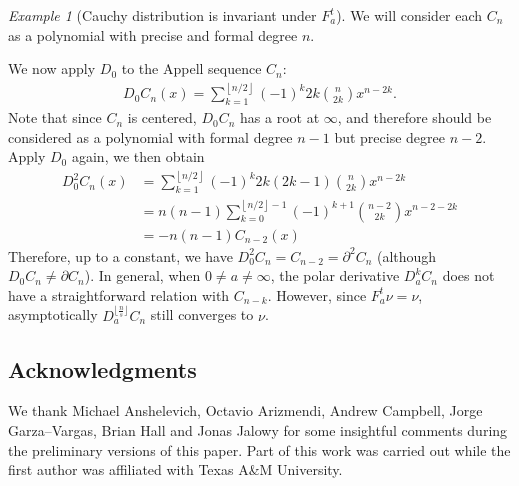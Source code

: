 \documentclass[reqno,11pt]{amsart}
\theoremstyle{remark}
\newtheorem{example}[theorem]{Example}
\newcommand{\polar}[1]{D_{#1}}
\newcommand{\pfreepower}[2]{F_{#1}^{#2}}
\begin{document}
\begin{example}[Cauchy distribution is invariant under $ \pfreepower{a}{t} $]
We will consider each $C_n$ as a polynomial with precise and formal degree $n$.

We now apply $\polar{0}$ to the Appell sequence $C_n$:
\begin{align*}\polar{0}C_n(x) = \sum_{k=1}^{\left\lfloor n/2 \right\rfloor} (-1)^k 2k\binom{n}{2k} x^{n-2k}.
\end{align*}
Note that since $C_n$ is centered, $\polar{0}C_n$ has a root at $\infty$, and therefore should be considered as a polynomial with formal degree $n-1$ but precise degree $n-2$. Apply $\polar{0}$ again, we then obtain
\begin{align*}
    \polar{0}^2C_n(x)&= \sum_{k=1}^{\left\lfloor n/2 \right\rfloor} (-1)^k 2k(2k-1)\binom{n}{2k} x^{n-2k}\\  &= n(n-1)\sum_{k=0}^{\left\lfloor n/2 \right\rfloor-1} (-1)^{k+1} \binom{n-2}{2k} x^{n-2-2k}\\&= -n(n-1)C_{n-2}(x)
\end{align*}
Therefore, up to a constant, we have $ \polar{0}^2C_n = C_{n-2}=\partial^2C_n $ (although $ \polar{0}C_n \neq \partial C_n  $). In general, when $0\neq a\neq\infty$, the polar derivative $\polar{a}^kC_n$ does not have a straightforward relation with $ C_{n-k} $. However, since $ \pfreepower{a}{t}\nu =\nu$, asymptotically $ \polar{a}^{\lfloor\tfrac{n}{s}\rfloor}C_n $ still converges to $ \nu $.

\end{example} 



\subsection*{Acknowledgments}

We thank Michael Anshelevich, Octavio Arizmendi, Andrew Campbell, Jorge Garza--Vargas, Brian Hall and Jonas Jalowy for some insightful comments during the preliminary versions of this paper. Part of this work was carried out while the first author was affiliated with Texas A\&M University. 



\end{document}
